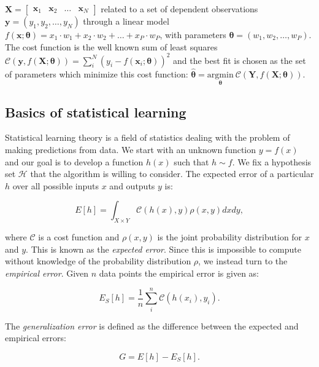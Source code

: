 $ \bm{X} = 
\begin{bmatrix}
\bm{x}_1 & \bm{x}_2 & \dots & \bm{x}_N
\end{bmatrix}
$
related to a set of dependent observations $\bm{y} = (y_1, y_2, \dots,y_N)$
through a linear model 
$f(\bm{x} ; \bm{\theta}) = 
x_1\cdot w_1 + x_2\cdot w_2 + \dots + x_P\cdot w_P$,
with parameters $\bm{\theta} = (w_1, w_2, \dots,w_P)$. 
The cost function is the well known sum of least squares 
$\mathcal{C}(\bm{y}, f(\bm{X} ; \bm{\theta}))
= \sum_i^N (y_i - f(\bm{x}_i ; \bm{\theta}))^2 $
and the best fit is chosen as the set
of parameters which minimize this cost function: 
$\hat{\bm{\theta}} = \underset{\bm{\theta}}
{\text{argmin}} \ \mathcal{C}(\bm{Y}, f(\bm{X} ; \bm{\theta})) $.

\subsection{Basics of statistical learning}
Statistical learning theory is a field of statistics dealing with the problem
of making predictions from data. We start with an unknown function \newline
$y = f(x)$ and our goal is to develop a function $h(x)$
such that $h \sim f$. We fix a hypothesis set $\mathcal{H}$ that the
algorithm is willing to consider. The expected error of a particular $h$
over all possible inputs $x$ and outputs $y$ is:

\begin{equation}
 E[h] = \int_{X \times Y} \mathcal{C}(h(x), y) \rho(x,y) dx dy ,
\end{equation}

where $\mathcal{C}$ is a cost function and $\rho(x,y)$ is the joint probability
distribution for $x$ and $y$. This is known as the \textit{expected error}.
Since this is impossible to compute without knowledge of the probability distribution
$\rho$, we instead turn to the \textit{empirical error}. Given $n$ data points
the empirical error is given as:

\begin{equation}
 E_S[h] = \frac{1}{n} \sum_i^n \mathcal{C}(h(x_i), y_i) .
\end{equation}

The \textit{generalization error} is defined as the difference
between the expected and empirical errors:

\begin{equation}
 G = E[h] - E_S[h] .
\end{equation}

